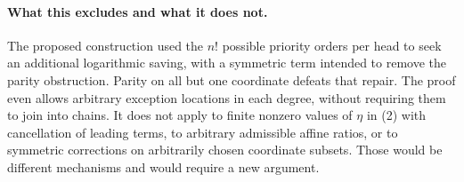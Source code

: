 \documentclass[11pt]{article}
\begin{document}
\paragraph{What this excludes and what it does not.}
The proposed construction used the $n!$ possible priority orders per
head to seek an additional logarithmic saving, with a symmetric term
intended to remove the parity obstruction. Parity on all but one
coordinate defeats that repair. The proof even allows arbitrary
exception locations in each degree, without requiring them to join
into chains. It does not apply to finite nonzero values of $\eta$ in
(2) with cancellation of leading terms, to arbitrary admissible
affine ratios, or to symmetric corrections on arbitrarily chosen
coordinate subsets. Those would be different mechanisms and would
require a new argument.
\end{document}
